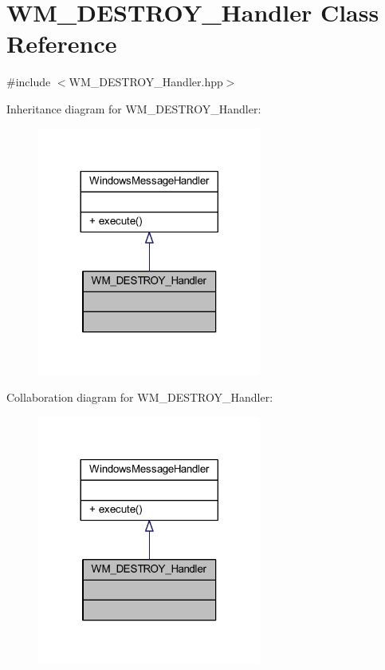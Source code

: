 \hypertarget{class_w_m___d_e_s_t_r_o_y___handler}{}\section{W\+M\+\_\+\+D\+E\+S\+T\+R\+O\+Y\+\_\+\+Handler Class Reference}
\label{class_w_m___d_e_s_t_r_o_y___handler}


{\ttfamily \#include $<$W\+M\+\_\+\+D\+E\+S\+T\+R\+O\+Y\+\_\+\+Handler.\+hpp$>$}



Inheritance diagram for W\+M\+\_\+\+D\+E\+S\+T\+R\+O\+Y\+\_\+\+Handler\+:\nopagebreak
\begin{figure}[H]
\begin{center}
\leavevmode
\includegraphics[width=209pt]{class_w_m___d_e_s_t_r_o_y___handler__inherit__graph}
\end{center}
\end{figure}


Collaboration diagram for W\+M\+\_\+\+D\+E\+S\+T\+R\+O\+Y\+\_\+\+Handler\+:\nopagebreak
\begin{figure}[H]
\begin{center}
\leavevmode
\includegraphics[width=209pt]{class_w_m___d_e_s_t_r_o_y___handler__coll__graph}
\end{center}
\end{figure}
